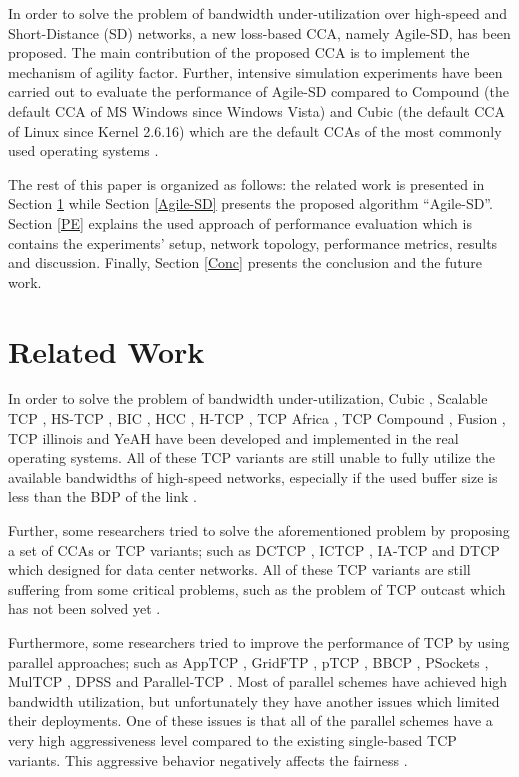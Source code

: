 \documentclass[preprint,3p,times,twocolumn,authoryear]{elsarticle}
\begin{document}
In order to solve the problem of bandwidth under-utilization over high-speed and Short-Distance (SD) networks, a new loss-based CCA, namely Agile-SD, has been proposed. The main contribution of the proposed CCA is to implement the mechanism of agility factor. Further, intensive simulation experiments have been carried out to evaluate the performance of Agile-SD compared to Compound (the default CCA of MS Windows since Windows Vista) and Cubic (the default CCA of Linux since Kernel 2.6.16) which are the default CCAs of the most commonly used operating systems \citep{Afanasyev2010, alrshah2014}.

The rest of this paper is organized as follows: the related work is presented in Section \ref{RW} while Section \ref{Agile-SD} presents the proposed algorithm \textquotedblleft Agile-SD\textquotedblright. Section \ref{PE} explains the used approach of performance evaluation which is contains the experiments' setup, network topology, performance metrics, results and discussion. Finally, Section \ref{Conc} presents the conclusion and the future work.

\section{Related Work}
\label{RW}

In order to solve the problem of bandwidth under-utilization, Cubic \citep{Ha2008}, Scalable TCP \citep{Kelly2003}, HS-TCP \citep{Floyd2003}, BIC \citep{xu2004}, HCC \citep{xu2011}, H-TCP \citep{Leith2004}, TCP Africa \citep{King2005}, TCP Compound \citep{Tan2006}, Fusion \citep{Kaneko2007}, TCP illinois \citep{Liu2008} and YeAH \citep{Baiocchi2007} have been developed and implemented in the real operating systems. All of these TCP variants are still unable to fully utilize the available bandwidths of high-speed networks, especially if the used buffer size is less than the BDP of the link \citep{Afanasyev2010, Scharf2011, Callegari2012b, Callegari2014, Lar2013, acharya2012, alrshah2014}. 

Further, some researchers tried to solve the aforementioned problem by proposing a set of CCAs or TCP variants; such as DCTCP \citep{Alizadeh2010}, ICTCP \citep{Haitao2013}, IA-TCP \citep{Jaehyun2012} and DTCP \citep{Vamanan2012} which designed for data center networks. All of these TCP variants are still suffering from some critical problems, such as the problem of TCP outcast which has not been solved yet \citep{Tahiliani2012}.

Furthermore, some researchers tried to improve the performance of TCP by using parallel approaches; such as AppTCP \citep{Wang2013}, GridFTP \citep{allcock2005}, pTCP \citep{hsieh2002}, BBCP \citep{hanushevsky2001}, PSockets \citep{sivakumar2000}, MulTCP \citep{crowcroft1998}, DPSS \citep{Tierney1994} and Parallel-TCP \citep{alrshah2009, alrshah2013}. Most of parallel schemes have achieved high bandwidth utilization, but unfortunately they have another issues which limited their deployments. One of these issues is that all of the parallel schemes have a very high aggressiveness level compared to the existing single-based TCP variants. This aggressive behavior negatively affects the fairness \citep{Fu2005, fu2007}.
\end{document}
